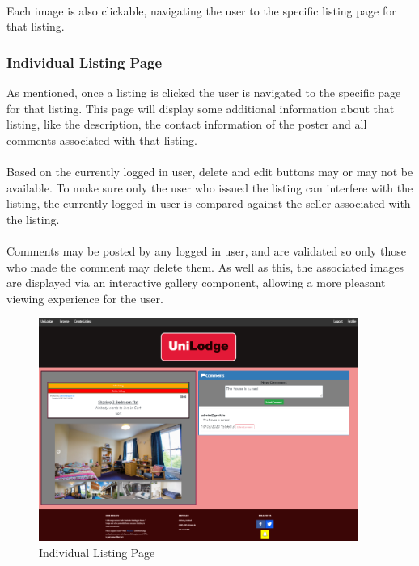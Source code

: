 \paragraph{}
Each image is also clickable, navigating the user to the specific listing page for that listing.

\subsubsection{Individual Listing Page}
As mentioned, once a listing is clicked the user is navigated to the specific page for that listing. This page will display some additional information about that listing, like the description, the contact information of the poster and all comments associated with that listing.

\paragraph{}
Based on the currently logged in user, delete and edit buttons may or may not be available. To make sure only the user who issued the listing can interfere with the listing, the currently logged in user is compared against the seller associated with the listing.

\paragraph{}
Comments may be posted by any logged in user, and are validated so only those who made the comment may delete them. As well as this, the associated images are displayed via an interactive gallery component, allowing a more pleasant viewing experience for the user.

\begin{figure}[H]
	\caption{Individual Listing Page}
	\label{image:indlisting}
	\centering
	\includegraphics[width=0.93\textwidth]{images/indiv_listing.png}
\end{figure}

